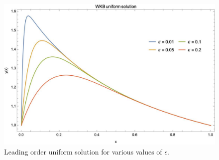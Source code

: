 \documentclass[12pt, a4paper]{article}
\begin{document}
\begin{enumerate}
\begin{enumerate}
        \begin{figure}[H]
            \centering
            \includegraphics[width=14cm]{568_HW6_Plot.jpg}
            \caption{Leading order uniform solution for various values of $\epsilon$.}
        \end{figure}


    \end{enumerate}
\end{enumerate}
\end{document}
